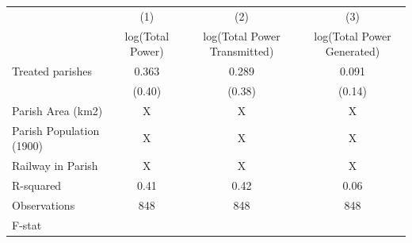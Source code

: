{
\def\sym#1{\ifmmode^{#1}\else\(^{#1}\)\fi}
\begin{tabular}{l*{3}{c}}
\hline\hline
                    &\multicolumn{1}{c}{(1)}         &\multicolumn{1}{c}{(2)}         &\multicolumn{1}{c}{(3)}         \\
                    &log(Total Power)         &log(Total Power Transmitted)         &log(Total Power Generated)         \\
\hline
Treated parishes    &       0.363         &       0.289         &       0.091         \\
                    &      (0.40)         &      (0.38)         &      (0.14)         \\
\hline
Parish Area (km2)   &           X         &           X         &           X         \\
Parish Population (1900)&           X         &           X         &           X         \\
Railway in Parish   &           X         &           X         &           X         \\
R-squared           &        0.41         &        0.42         &        0.06         \\
Observations        &         848         &         848         &         848         \\
F-stat              &                     &                     &                     \\
\hline\hline
\end{tabular}
}
